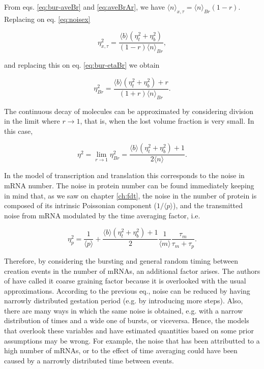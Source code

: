 From eqs. \eqref{eq:bur-aveBr} and \eqref{eq:aveBrAr}, we have $\langle n\rangle_{x,\tau}=\langle n\rangle_{Br}(1-r)$. Replacing on eq. \eqref{eq:noisex}

\begin{equation*}
  \eta^2_{x,\tau} = \frac{\langle b\rangle(\eta^2_t+\eta^2_b)}{(1-r)\langle n\rangle_{Br}},
\end{equation*}

and replacing this on eq. \eqref{eq:bur-etaBr} we obtain

\begin{equation*}
  \eta^2_{Br} = \frac{\langle b\rangle(\eta^2_t+\eta^2_b) + r}{(1+r)\langle n\rangle_{Br}}.
\end{equation*}

The continuous decay of molecules can be approximated by considering division in the limit where $r\to 1$, that is, when the lost volume fraction is very small. In this case,

\begin{equation*}
  \eta^2 = \lim_{r\to 1}\eta^2_{Br} = \frac{\langle b\rangle(\eta^2_t+\eta^2_b) + 1}{2\langle n\rangle}.
\end{equation*}

In the model of transcription and translation this corresponds to the noise in mRNA number. The noise in protein number can be found immediately keeping in mind that, as we saw on chapter \ref{ch:fdt}, the noise in the number of protein is composed of its intrinsic Poissonian component ($1/\langle p\rangle$), and the transmitted noise from mRNA modulated by the time averaging factor, i.e.

\begin{equation*}
  \eta^2_p = \frac{1}{\langle p\rangle} + \frac{\langle b\rangle(\eta^2_t+\eta^2_b) + 1}{2}\frac{1}{\langle m\rangle}\frac{\tau_m}{\tau_m+\tau_p}.
\end{equation*}

Therefore, by considering the bursting and general random timing between creation events in the number of mRNAs, an additional factor arises. The authors of \cite{pedraza08} have called it coarse graining factor because it is overlooked with the usual approximations. According to the previous eq., noise can be reduced by having narrowly distributed gestation period (e.g. by introducing more steps). Also, there are many ways in which the same noise is obtained, e.g. with a narrow distribution of times and a wide one of bursts, or viceversa. Hence, the models that overlook these variables and have estimated quantities based on some prior assumptions may be wrong. For example, the noise that has been attributted to a high number of mRNAs, or to the effect of time averaging could have been caused by a narrowly distributed time between events.

